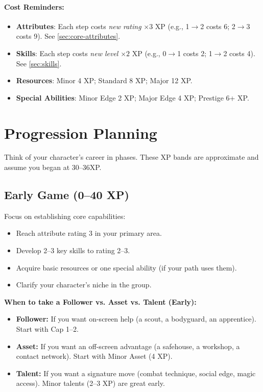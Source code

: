 \paragraph{Cost Reminders:}
\begin{itemize}
\item \textbf{Attributes}: Each step costs \emph{new rating} \(\times 3\) XP (e.g., 1\(\to\)2 costs 6; 2\(\to\)3 costs 9). See \ref{sec:core-attributes}.
\item \textbf{Skills}: Each step costs \emph{new level} \(\times 2\) XP (e.g., 0\(\to\)1 costs 2; 1\(\to\)2 costs 4). See \ref{sec:skills}.
\item \textbf{Resources}: Minor 4 XP; Standard 8 XP; Major 12 XP.
\item \textbf{Special Abilities}: Minor Edge 2 XP; Major Edge 4 XP; Prestige 6+ XP.
\end{itemize}


\section{Progression Planning}
\label{sec:xp-progression}

Think of your character's career in phases. These XP bands are approximate and
assume you began at 30--36XP.

\subsection*{Early Game (0--40 XP)}
\label{sec:xp-early-game}

Focus on establishing core capabilities:
\begin{itemize}
\item Reach attribute rating 3 in your primary area.
\item Develop 2--3 key skills to rating 2--3.
\item Acquire basic resources or one special ability (if your path uses them).
\item Clarify your character's niche in the group.
\end{itemize}

\noindent\textbf{When to take a Follower vs. Asset vs. Talent (Early):}
\begin{itemize}
  \item \textbf{Follower:} If you want on-screen help (a scout, a bodyguard, an apprentice). Start with Cap 1--2.
  \item \textbf{Asset:} If you want an off-screen advantage (a safehouse, a workshop, a contact network). Start with Minor Asset (4 XP).
  \item \textbf{Talent:} If you want a signature move (combat technique, social edge, magic access). Minor talents (2--3 XP) are great early.
\end{itemize}

